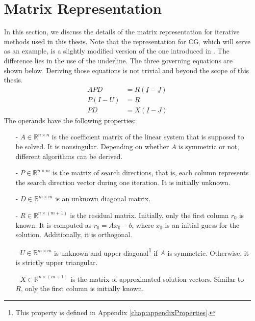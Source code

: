 \section{Matrix Representation}
\label{sec:matrixRepresentationIntroduction}

In this section, we discuss the details of the matrix representation for iterative methods used in this thesis. Note that the representation for CG, which will serve as an example, is a slightly modified version of the one introduced in \cite{eijkhout:CGderivation}. The difference lies in the use of the underline.
%
%
%
%
The three governing equations are shown below. Deriving those equations is not trivial and beyond the scope of this thesis. 
%
\begin{align}
A P D &= R \left( \underline{I} - \underline{J}  \right) \label{eq:CGrr1} \\
P \left( I - U \right) &= \underline{R} \label{eq:CGrr2} \\
P D &= X \left( \underline{I} - \underline{J} \right) \label{eq:CGrr3}
\end{align}
%
The operands have the following properties:
%
\begin{itemize}
%
\item[-] $A \in \mathbb{R}^{n \times n}$ is the coefficient matrix of the linear system that is supposed to be solved. It is nonsingular. Depending on whether $A$ is symmetric or not, different algorithms can be derived.
%
\item[-] $P \in \mathbb{R}^{n \times m}$ is the matrix of search directions, that is, each column represents the search direction vector during one iteration. It is initially unknown.
%
\item[-] $D \in \mathbb{R}^{m \times m}$ is an unknown diagonal matrix.
%
\item[-] $R \in \mathbb{R}^{n \times (m + 1)}$ is the residual matrix. Initially, only the first column $r_0$ is known. It is computed as $r_0 = A x_0 - b$, where $x_0$ is an initial guess for the solution. Additionally, it is orthogonal.
%
\item[-] $U \in \mathbb{R}^{m \times m}$ is unknown and upper diagonal\footnote{This property is defined in Appendix \ref{chap:appendixProperties}.} if $A$ is symmetric. Otherwise, it is strictly upper triangular.
%
\item[-] $X \in \mathbb{R}^{n \times (m + 1)}$ is the matrix of approximated solution vectors. Similar to $R$, only the first column is initially known.
%
\end{itemize}


